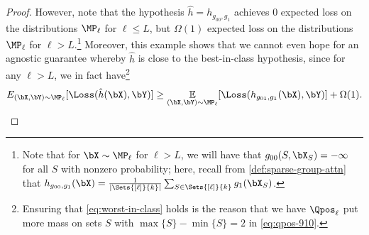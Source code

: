\documentclass{article}
\begin{document}
\begin{proof}
    However, note that the hypothesis $\hat h = h_{g_{00}, g_1}$ achieves {0 expected loss} on the distributions $\MP_\ell$ for $\ell \leq L$, but $\Omega(1)$ expected loss on the distributions $\MP_\ell$ for $\ell > L$.\footnote{Note that for $\bX \sim \MP_\ell$ for $\ell > L$, we will have that $g_{00}(S, \bX_S) = -\infty$ for all $S$ with nonzero probability; here, recall from \cref{def:sparse-group-attn} that $h_{g_{00}, g_1}(\bX) = \frac{1}{|\Sets{[\ell]}{k}|} \sum_{S \in \Sets{[\ell]}{k}} g_1(\bX_S)$.} Moreover, this example shows that we cannot even hope for an agnostic guarantee whereby $\hat h$ is close to the best-in-class hypothesis, since for any $\ell > L$, we in fact have\footnote{Ensuring that \cref{eq:worst-in-class} holds is the reason that we have $\Qpos_\ell$ put more mass on sets $S$ with $\max\{S \} - \min\{S\}  = 2$ in \cref{eq:qpos-910}.}
    \begin{align}
E_{(\bX, \bY) \sim \MP_\ell}[\Loss(\hat h(\bX), \bY)] \geq \E_{(\bX, \bY) \sim \MP_\ell}[\Loss(h_{g_{01}, g_1}(\bX), \bY)] + \Omega(1)\label{eq:worst-in-class}.
    \end{align}


\end{proof}
\end{document}
